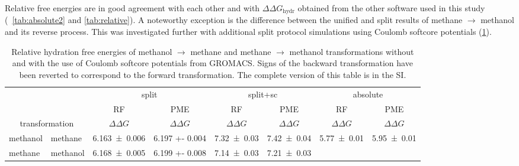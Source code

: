 \documentclass[journal=jctcce,manuscript=article]{achemso}
\providecommand{\DIFadd}[1]{\protect\cbstart{\protect\color{blue}\uwave{#1}}\protect\cbend} %
\providecommand{\DIFdel}[1]{\protect\cbdelete{\protect\color{red}\sout{#1}}\protect\cbdelete} %
\providecommand{\DIFaddbegin}{} %
\providecommand{\DIFaddend}{} %
\providecommand{\DIFdelbegin}{} %
\providecommand{\DIFdelend}{} %
\newcommand{\DIFscaledelfig}{0.5}
\newlength{\DIFdelgraphicswidth} %
\newlength{\DIFdelgraphicsheight} %
\newcommand{\DIFaddincludegraphics}[2][]{{\color{blue}\fbox{\DIFOincludegraphics[#1]{#2}}}} %
\newcommand{\DIFdelincludegraphics}[2][]{%
\sbox{\DIFdelgraphicsbox}{\DIFOincludegraphics[#1]{#2}}%
\settoboxwidth{\DIFdelgraphicswidth}{\DIFdelgraphicsbox} %
\settoboxtotalheight{\DIFdelgraphicsheight}{\DIFdelgraphicsbox} %
\scalebox{\DIFscaledelfig}{%
\parbox[b]{\DIFdelgraphicswidth}{\usebox{\DIFdelgraphicsbox}\\[-\baselineskip] \rule{\DIFdelgraphicswidth}{0em}}\llap{\resizebox{\DIFdelgraphicswidth}{\DIFdelgraphicsheight}{%
\setlength{\unitlength}{\DIFdelgraphicswidth}%
\begin{picture}(1,1)%
\thicklines\linethickness{2pt} %
{\color[rgb]{1,0,0}\put(0,0){\framebox(1,1){}}}%
{\color[rgb]{1,0,0}\put(0,0){\line( 1,1){1}}}%
{\color[rgb]{1,0,0}\put(0,1){\line(1,-1){1}}}%
\end{picture}%
}\hspace*{3pt}}} %
} %
\DeclareRobustCommand{\DIFaddbegin}{\DIFOaddbegin \let\includegraphics\DIFaddincludegraphics} %
\DeclareRobustCommand{\DIFaddend}{\DIFOaddend \let\includegraphics\DIFOincludegraphics} %
\DeclareRobustCommand{\DIFdelbegin}{\DIFOdelbegin \let\includegraphics\DIFdelincludegraphics} %
\DeclareRobustCommand{\DIFdelend}{\DIFOaddend \let\includegraphics\DIFOincludegraphics} %
\begin{document}
Relative free energies are in good agreement with each other and with
$\Delta \Delta G_{\mathrm{hydr}}$ obtained from the other software used in this
study (\DIFdelbegin \DIFdel{Tables}\DIFdelend \DIFaddbegin \DIFadd{Tab.}\DIFaddend ~\ref{tab:absolute2} and \ref{tab:relative}).  A noteworthy
exception is the difference between the unified and split results of methane
$\rightarrow$ methanol and its reverse process. This was investigated further with
additional split protocol simulations using Coulomb softcore potentials (\DIFdelbegin \DIFdel{Table
}\DIFdelend \DIFaddbegin \DIFadd{Tab.
}\DIFaddend \ref{tab:eff-sc}).

\begin{table}[]
\centering
\caption{Relative hydration free energies of methanol $\rightarrow$ methane and
methane $\rightarrow$ methanol transformations without and with the use of
Coulomb softcore potentials from GROMACS. Signs of the backward
transformation have been reverted to correspond to the forward transformation.
The complete version of this table is in the SI.}
\label{tab:eff-sc}
\begin{tabular}{@{}llclclcl@{}}
\toprule
 &  & \multicolumn{2}{c}{split} & \multicolumn{2}{c}{split+sc} &
 \multicolumn{2}{c}{absolute} \\
 &  & RF & \multicolumn{1}{c}{PME} & RF & \multicolumn{1}{c}{PME} & RF &
 \multicolumn{1}{c}{PME} \\
\multicolumn{2}{c}{transformation} & $\Delta \Delta G$ &
\multicolumn{1}{c}{$\Delta \Delta G$} & $\Delta \Delta G$ &
\multicolumn{1}{c}{$\Delta \Delta G$} & $\Delta \Delta G$ &
\multicolumn{1}{c}{$\Delta \Delta G$} \\ \midrule
methanol & methane & \multicolumn{1}{l}{\num{6.163 +- 0.006}} & \num{6.197 +-
0.004} & \multicolumn{1}{l}{\num{7.32+-0.03}} & \num{7.42+-0.04} &
\multicolumn{1}{l}{\num{5.77 +- 0.01}} & \num{5.95 +- 0.01} \\
methane & methanol & \multicolumn{1}{l}{\num{6.168 +- 0.005}} & \num{6.199 +-
0.008} & \multicolumn{1}{l}{\num{7.14+-0.03}} & \num{7.21+-0.03} &
\multicolumn{1}{l}{} &  \\ \bottomrule
\end{tabular}
\end{table}
\end{document}
